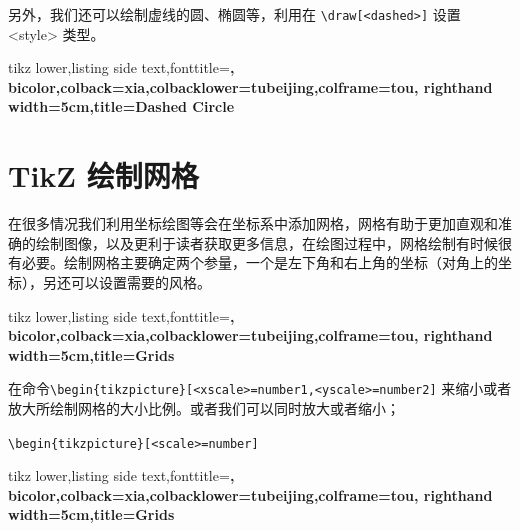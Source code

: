\documentclass[cn,11pt, simple]{elegantbook}
\begin{document}
另外，我们还可以绘制虚线的圆、椭圆等，利用在 \verb|\draw[<dashed>]| 设置 <style> 类型。

\begin{tcblisting}{tikz lower,listing side text,fonttitle=\bfseries,
	bicolor,colback=xia,colbacklower=tubeijing,colframe=tou,
	righthand width=5cm,title=Dashed Circle}
\end{tcblisting}

\section{TikZ 绘制网格}
\begin{tcolorbox}[enhanced,arc=3mm,boxrule=1.5mm,
	frame hidden,colback=blue!10!white,
	borderline={1mm}{0mm}{blue,dotted} ]
	在很多情况我们利用坐标绘图等会在坐标系中添加网格，网格有助于更加直观和准确的绘制图像，以及更利于读者获取更多信息，在绘图过程中，网格绘制有时候很有必要。绘制网格主要确定两个参量，一个是左下角和右上角的坐标（对角上的坐标），另还可以设置需要的风格。
	\end{tcolorbox}

\begin{tcblisting}{tikz lower,listing side text,fonttitle=\bfseries,
	bicolor,colback=xia,colbacklower=tubeijing,colframe=tou,
	righthand width=5cm,title=Grids}
\end{tcblisting}

在命令\verb|\begin{tikzpicture}[<xscale>=number1,<yscale>=number2]| 来缩小或者放大所绘制网格的大小比例。或者我们可以同时放大或者缩小；
	
\verb|\begin{tikzpicture}[<scale>=number]|
	

\begin{tcblisting}{tikz lower,listing side text,fonttitle=\bfseries,
	bicolor,colback=xia,colbacklower=tubeijing,colframe=tou,
	righthand width=5cm,title=Grids}
\end{tcblisting}
\end{document}
